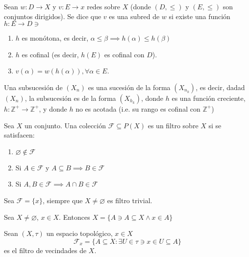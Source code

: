 \documentclass[a4paper, 12pt]{article}
\begin{document}
\begin{definicion}
    Sean $w:D\to X$ y $v: E\to x$ redes sobre $X$ (donde $(D,\leq)$ y $(E,\leq )$ son conjuntos dirigidos). Se dice que $v$ es una subred de $w$ si existe una función $h:E\to D\ni$ 
    \begin{enumerate}
        \item $h$ es monótona, es decir, $\alpha\leq \beta\implies h(\alpha)\leq h(\beta)$
        \item $h$ es cofinal (es decir, $h(E)$ es cofinal con $D$).
        \item $v(\alpha)=w(h(\alpha)),\forall \alpha\in E$.
    \end{enumerate}
    
\end{definicion}

\begin{definicion}[Subsucesión]
    Una subsucesión de $(X_n)$ es una sucesión de la forma $(X_{n_k})$, es decir, dadad $(X_n)$, la subsucesión es de la forma $(X_{h_k})$, donde $h$ es una función creciente, $h:\mathbb{Z}^+\to \mathbb{Z}^+$, y donde $h$ no es acotada (i.e. su rango es cofinal con $\mathbb{Z}^+$)
\end{definicion}
\begin{definicion}
    Sea $X$ un conjunto. Una colección $\mathcal{F}\subseteq P(X)$ es un filtro sobre $X$ si se satisfacen: 
    \begin{enumerate}
        \item $\varnothing\not\in \mathcal{F}$
        \item Si $A\in \mathcal{F}$ y $A\subseteq B\implies B\in \mathcal{F}$ 
        \item Si $A,B\in \mathcal{F}\implies A\cap B\in \mathcal{F}$
    \end{enumerate}
\end{definicion}

\begin{ejemplo}
    Sea $\mathcal{F}=\{x\}$, siempre que $X\neq \varnothing$ es filtro trivial. 
\end{ejemplo}

\begin{ejemplo}
    Sea $X\neq \varnothing$, $x\in X$. Entonces $X= \{A\ni A\subseteq X\wedge x\in A\}$
\end{ejemplo}
\begin{ejemplo}
    Sean $(X,\tau)$ un espacio topológico, $x\in X$ 
    $$\mathcal{F}_x=\{A\subseteq X: \exists U\in \tau \ni x\in U\subseteq A\}$$
    es el filtro de vecindades de $X$. 
\end{ejemplo}
\end{document}
